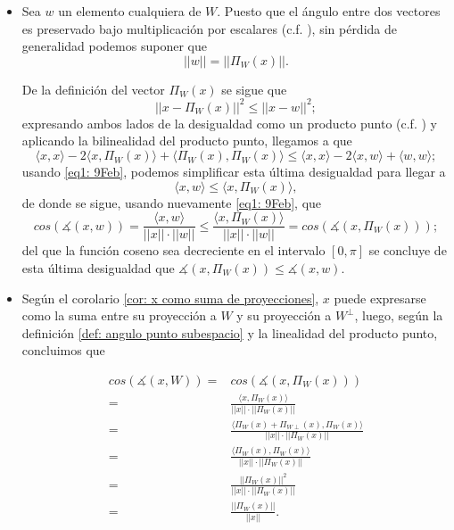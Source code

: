 \begin{itemize}
\item  Sea $w$ un elemento cualquiera de $W$.
Puesto que el ángulo entre dos vectores es
preservado bajo multiplicación por escalares
(c.f. ), sin pérdida de generalidad
podemos suponer que 
\begin{equation}
\label{eq1: 9Feb}
||w||= || \Pi_{W}(x)||.
\end{equation}

De la definición del vector $\Pi_{W}(x)$ se sigue que
\[
|| x -\Pi_{W}(x) ||^{2} \leq  || x - w||^{2};
\]
expresando ambos lados de la desigualdad como un producto
punto (c.f. ) y aplicando la
bilinealidad del producto punto, llegamos a que
\[
\langle x , x \rangle -2 \langle x, \Pi_{W}(x) \rangle +
\langle \Pi_{W}(x) , \Pi_{W}(x) \rangle \leq 
\langle x , x \rangle  -2 \langle x , w \rangle 
+ \langle w , w \rangle ;
\]
usando \eqref{eq1: 9Feb}, podemos simplificar esta
última desigualdad para llegar a 
\[
\langle x, w \rangle \leq \langle x, \Pi_{W}(x) \rangle,
\]
de donde se sigue, usando nuevamente \eqref{eq1: 9Feb},
que 
\[
cos \left( \measuredangle (x,w) \right) =
\frac{\langle x , w \rangle}{||x||\cdot ||w||} \leq
\frac{\langle x ,  \Pi_{W}(x)  \rangle}{||x||\cdot ||w||} =
cos \left( \measuredangle \left(x, \Pi_{W}(x) \right) \right);
\]
del que la función coseno sea decreciente en el intervalo
$[0, \pi]$ se concluye de esta última desigualdad que
$ \measuredangle \left(x, \Pi_{W}(x) \right) \leq 
\measuredangle (x,w)$.

\item Según el corolario 
\ref{cor: x como suma de proyecciones}, 
$x$ puede expresarse como la suma entre su proyección
a $W$ y su proyección a $W^{\perp}$, luego,
según la definición \ref{def: angulo punto subespacio}
y la linealidad del producto punto, concluimos que

\begin{align*}
cos \left( \measuredangle (x, W) \right) = &
cos \left( \measuredangle (x, \Pi_{W}(x)) \right)  \\
= & 
\frac{\langle x , \Pi_{W}(x) \rangle}{||x|| \cdot || \Pi_{W}(x)||}  \\
= & 
\frac{\langle \Pi_{W}(x)+\Pi_{W\perp}(x) , \Pi_{W}(x) \rangle}{||x|| \cdot || \Pi_{W}(x)||}\\
= & \frac{\langle \Pi_{W}(x) , \Pi_{W}(x) \rangle}{||x|| \cdot || \Pi_{W}(x)||}\\
= & \frac{|| \Pi_{W}(x) ||^{2}}{||x|| \cdot || \Pi_{W}(x)||}\\
= & \frac{|| \Pi_{W}(x) ||}{||x||}.
\end{align*}
\end{itemize}

